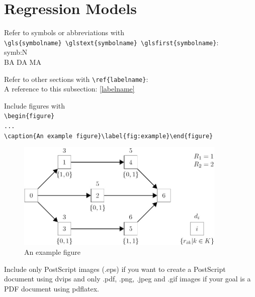 \section{Regression Models}

Refer to symbols or abbreviations with\\\verb+\gls{symbolname} \glstext{symbolname} \glsfirst{symbolname}+:\\
\gls{symb:N}  \\
\gls{BA} \gls{DA} \gls{MA}

Refer to other sections with \verb+\ref{labelname}+:\\
A reference to this subsection: \ref{labelname}

Include figures with\\
\verb+\begin{figure}+\\
\verb+...+\\
\verb+\caption{An example figure}\label{fig:example}\end{figure}+

\begin{figure}[h]
\begin{center}
\includegraphics[width=10cm]{images/example_figure}
\caption{An example figure}
\label{fig:example}
\end{center}
\end{figure}

Include only PostScript images (.eps) if you want to create a PostScript document using dvips and only .pdf, .png, .jpeg and .gif images if your goal is a PDF document using pdflatex.